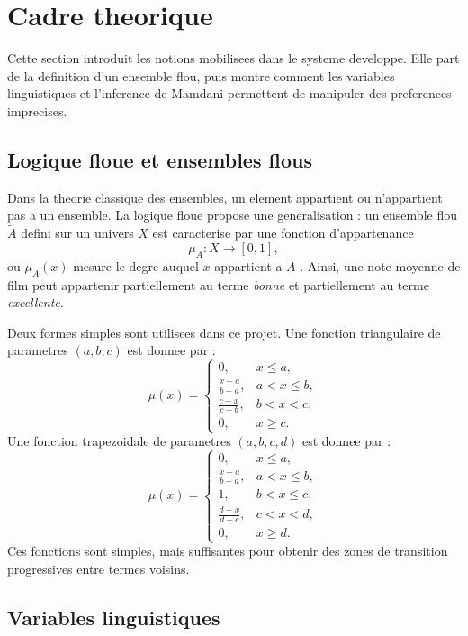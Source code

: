 \section{Cadre theorique}

Cette section introduit les notions mobilisees dans le systeme developpe. Elle part de la definition d'un ensemble flou, puis montre comment les variables linguistiques et l'inference de Mamdani permettent de manipuler des preferences imprecises.

\subsection{Logique floue et ensembles flous}

Dans la theorie classique des ensembles, un element appartient ou n'appartient pas a un ensemble. La logique floue propose une generalisation : un ensemble flou $\tilde{A}$ defini sur un univers $X$ est caracterise par une fonction d'appartenance
\[
\mu_A : X \rightarrow [0,1],
\]
ou $\mu_A(x)$ mesure le degre auquel $x$ appartient a $\tilde{A}$ \cite{zadeh1965,klir1995}. Ainsi, une note moyenne de film peut appartenir partiellement au terme \emph{bonne} et partiellement au terme \emph{excellente}.

Deux formes simples sont utilisees dans ce projet. Une fonction triangulaire de parametres $(a,b,c)$ est donnee par :
\[
\mu(x)=
\begin{cases}
0, & x \leq a,\\
\frac{x-a}{b-a}, & a < x \leq b,\\
\frac{c-x}{c-b}, & b < x < c,\\
0, & x \geq c.
\end{cases}
\]
Une fonction trapezoidale de parametres $(a,b,c,d)$ est donnee par :
\[
\mu(x)=
\begin{cases}
0, & x \leq a,\\
\frac{x-a}{b-a}, & a < x \leq b,\\
1, & b < x \leq c,\\
\frac{d-x}{d-c}, & c < x < d,\\
0, & x \geq d.
\end{cases}
\]
Ces fonctions sont simples, mais suffisantes pour obtenir des zones de transition progressives entre termes voisins.

\subsection{Variables linguistiques}

